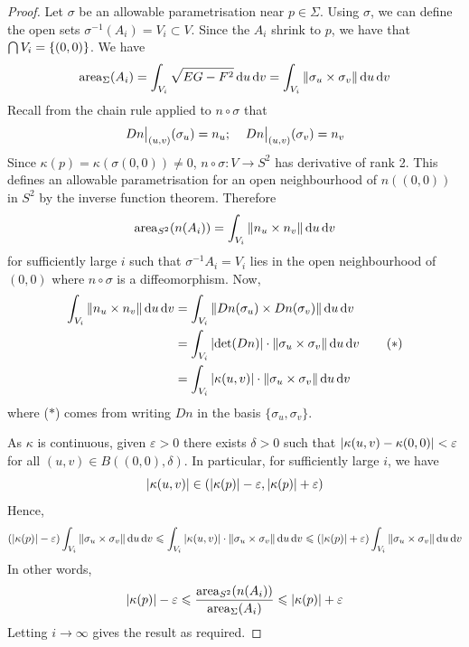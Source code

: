 \documentclass[a4paper,11pt]{article}
\begin{document}
\begin{proof}
	Let \( \sigma \) be an allowable parametrisation near \( p \in \Sigma \).
	Using \( \sigma \), we can define the open sets \( \sigma^{-1}(A_i) = V_i \subset V \).
	Since the \( A_i \) shrink to \( p \), we have that \( \bigcap V_i = \qty{(0,0)} \).
	We have
	\[
		\mathrm{area}_\Sigma(A_i) = \int_{V_i} \sqrt{EG - F^2} \dd{u} \dd{v} = \int_{V_i} \norm{\sigma_u \times \sigma_v} \dd{u}\dd{v}
	\]
	Recall from the chain rule applied to \( n \circ \sigma \) that
	\[
		\teval{Dn}{(u,v)}(\sigma_u) = n_u;\quad \teval{Dn}{(u,v)}(\sigma_v) = n_v
	\]
	Since \( \kappa(p) = \kappa(\sigma(0,0)) \neq 0 \), \( n \circ \sigma \colon V \to S^2 \) has derivative of rank 2.
	This defines an allowable parametrisation for an open neighbourhood of \( n((0,0)) \) in $ S^2 $ by the inverse function theorem. Therefore
	\[
		\mathrm{area}_{S^2}(n(A_i)) = \int_{V_i} \norm{n_u \times n_v} \dd{u} \dd{v}
	\]
	for sufficiently large \( i \) such that \( \sigma^{-1} A_i = V_i \) lies in the open neighbourhood of \( (0,0) \) where \( n \circ \sigma \) is a diffeomorphism. Now, 
	\begin{align*}
		\int_{V_i} \norm{n_u \times n_v} \dd{u} \dd{v} & = \int_{V_i} \norm{Dn(\sigma_u) \times Dn(\sigma_v)} \dd{u} \dd{v}                \\
		                                               & = \int_{V_i} \abs{\det (Dn)} \cdot \norm{\sigma_u \times \sigma_v} \dd{u} \dd{v} \tag{$*$} \\
		                                               & = \int_{V_i} \abs{\kappa(u,v)} \cdot \norm{\sigma_u \times \sigma_v} \dd{u}\dd{v}
	\end{align*}
	where ($*$) comes from writing $Dn$ in the basis $ \{\sigma_u,\sigma_v\} $. 

	As \( \kappa \) is continuous, given \( \varepsilon > 0 \) there exists \( \delta > 0 \) such that \( \abs{\kappa(u,v) - \kappa(0,0)} < \varepsilon \) for all \( (u,v) \in B((0,0), \delta) \).
	In particular, for sufficiently large \( i \), we have
	\[
		\abs{\kappa(u,v)} \in \qty(\abs{\kappa(p)}-\varepsilon, \abs{\kappa(p)}+\varepsilon)
	\]
	Hence,
	\[
		\qty(\abs{\kappa(p)}-\varepsilon) \int_{V_i} \norm{\sigma_u \times \sigma_v} \dd{u}\dd{v} \leqslant \int_{V_i} \abs{\kappa(u,v)} \cdot \norm{\sigma_u \times \sigma_v} \dd{u}\dd{v} \leqslant \qty(\abs{\kappa(p)}+\varepsilon) \int_{V_i} \norm{\sigma_u \times \sigma_v} \dd{u}\dd{v}
	\]
	In other words,
	\[
		\abs{\kappa(p)}-\varepsilon \leqslant \frac{\mathrm{area}_{S^2} (n(A_i))}{\mathrm{area}_{\Sigma} (A_i)} \leqslant \abs{\kappa(p)} + \varepsilon
	\]
	Letting \( i \to \infty \) gives the result as required.
\end{proof}
\end{document}
